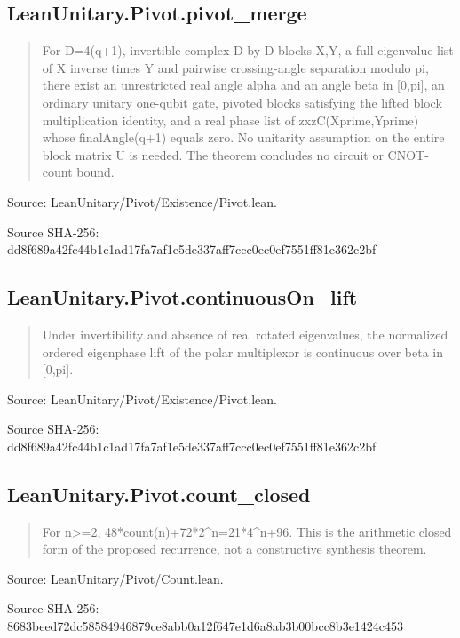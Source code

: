 \documentclass[11pt,a4paper]{article}
\begin{document}
\begin{samepage}
\subsection{LeanUnitary.Pivot.pivot\_merge}
\begin{quote}\small\ttfamily For D=4(q+1), invertible complex D-by-D blocks X,Y, a full eigenvalue list of X inverse times Y and pairwise crossing-angle separation modulo pi, there exist an unrestricted real angle alpha and an angle beta in [0,pi], an ordinary unitary one-qubit gate, pivoted blocks satisfying the lifted block multiplication identity, and a real phase list of zxzC(Xprime,Yprime) whose finalAngle(q+1) equals zero. No unitarity assumption on the entire block matrix U is needed. The theorem concludes no circuit or CNOT-count bound.\end{quote}
{\small Source: LeanUnitary/Pivot/Existence/Pivot.lean.\par}

{\small Source SHA-256: dd8f689a42fc44b1c1ad17fa7af1e5de337aff7ccc0ec0ef7551ff81e362c2bf\par}

\end{samepage}
\begin{samepage}
\subsection{LeanUnitary.Pivot.continuousOn\_lift}
\begin{quote}\small\ttfamily Under invertibility and absence of real rotated eigenvalues, the normalized ordered eigenphase lift of the polar multiplexor is continuous over beta in [0,pi].\end{quote}
{\small Source: LeanUnitary/Pivot/Existence/Pivot.lean.\par}

{\small Source SHA-256: dd8f689a42fc44b1c1ad17fa7af1e5de337aff7ccc0ec0ef7551ff81e362c2bf\par}

\end{samepage}
\begin{samepage}
\subsection{LeanUnitary.Pivot.count\_closed}
\begin{quote}\small\ttfamily For n>=2, 48*count(n)+72*2\textasciicircum{}n=21*4\textasciicircum{}n+96. This is the arithmetic closed form of the proposed recurrence, not a constructive synthesis theorem.\end{quote}
{\small Source: LeanUnitary/Pivot/Count.lean.\par}

{\small Source SHA-256: 8683beed72dc58584946879ce8abb0a12f647e1d6a8ab3b00bcc8b3e1424c453\par}

\end{samepage}
\end{document}

